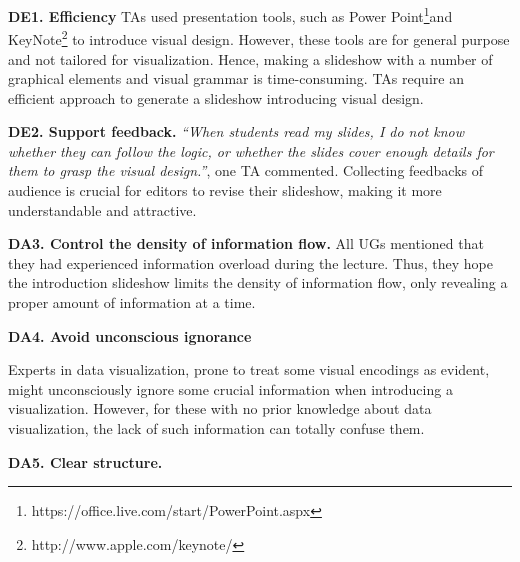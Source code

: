 
\textbf{DE1. Efficiency}
TAs used presentation tools, such as Power Point\footnote{https://office.live.com/start/PowerPoint.aspx}and KeyNote\footnote{http://www.apple.com/keynote/} to introduce visual design. However, these tools are for general purpose and not tailored for visualization. Hence, making a slideshow with a number of graphical elements and visual grammar is time-consuming. TAs require an efficient approach to generate a slideshow introducing visual design.


\textbf{DE2. Support feedback.} \textit{``When students read my slides, I do not know whether they can follow the logic, or whether the slides cover enough details for them to grasp the visual design.''}, one TA commented. Collecting feedbacks of audience is crucial for editors to revise their slideshow, making it more understandable and attractive.  


\textbf{DA3. Control the density of information flow.} 
All UGs mentioned that they had experienced information overload during the lecture. Thus, they hope the introduction slideshow limits the density of information flow, only revealing a proper amount of information at a time. 

\textbf{DA4. Avoid unconscious ignorance}

Experts in data visualization, prone to treat some visual encodings as evident, might unconsciously ignore some crucial information when introducing a visualization. However, for these with no prior knowledge about data visualization, the lack of such information can totally confuse them. 

\textbf{DA5. Clear structure.}

